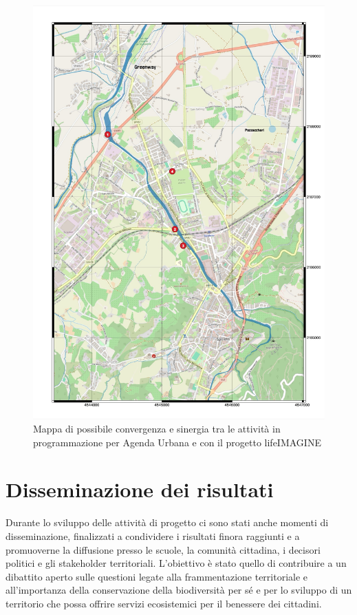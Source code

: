 \documentclass[
  a4paper,
]{book}
\begin{document}
\begin{figure}

{\centering \includegraphics[width=\linewidth]{./figs/agendaUrbana/Spoleto_AgendaUrbanalifeIMAGINE20250513} 

}

\caption{Mappa di possibile convergenza e sinergia tra le attività in programmazione per Agenda Urbana e con il progetto lifeIMAGINE}\label{fig:agULife}
\end{figure}

\chapter{Disseminazione dei risultati}\label{obs}

Durante lo sviluppo delle attività di progetto ci sono stati anche momenti di disseminazione, finalizzati a condividere i risultati finora raggiunti e a promuoverne la diffusione presso le scuole, la comunità cittadina, i decisori politici e gli stakeholder territoriali. L'obiettivo è stato quello di contribuire a un dibattito aperto sulle questioni legate alla frammentazione territoriale e all'importanza della conservazione della biodiversità per sé e per lo sviluppo di un territorio che possa offrire servizi ecosistemici per il benessere dei cittadini.
\end{document}
